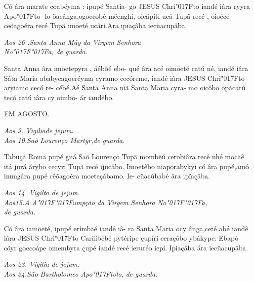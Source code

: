 \documentclass[openany,titlepage,12pt]{book}
\newcommand{\lgS}{\char"017F}
\newcommand{\lgSS}{\char"017F\char"017F}
\begin{document}
{\hspace*{-2ex}Có âra marate coabëyma : ipupé Santia-
go JESUS Chri\lgS to  iandé iâra ryyra Apo\lgS to-
lo öacânga,ogoecobé mëenghi, oieäpiti ucá
Tupã recé , oioécé cëõagoéra recé Tupã\linebreak
imöeté ucâri.Ara ipïaçâba iecüacupâba.}
\vspace*{2ex}
\begin{center}
    \textit{\footnotesize Aos 26 .Santa Anna Mãy da Virgem Senhora\\
    No\lgSS a, de guarda.}
\end{center}

{\hspace{-2ex}Santa Anna âra imöetepyra , äébõé ebo-
qué âra acé oimöeté catú né, iandé iâra Sãta
Maria ababycagoeréyma cyramo cecóreme,
iandé iâra JESUS Chri\lgS to  aryiamo cecó re-
cébé.Aé Santa Anna niã Santa Maria cyra-
mo oicôbo opácatú tecó catú iâra cy oimbö-
ár iandêbo.}

\begin{center}
    {EM AGOSTO.\\}
\end{center}
\begin{center}
    \textit{\footnotesize Aos 9. Vigiliade jejum.\\
    Aos 10.Saõ Lourenço Martyr,de guarda.}
\end{center}

{Tabuçá Roma pupé guá Saõ Lourenço
Tupã mombëú cerobiâra recé nhé mocäê
itá jurá árybo cecyri Tupã recé ijucâbo.
Imoetêbo niaporabykyi có âra pupé,amó
inungâra pupé cêõagoéra moeteçábamo. Ie-
cüacúbabé âra ipïaçâba.
}

\begin{center}
    \textit{\footnotesize Aos 14. Vigilta de jejum.\\
    Aos15.A A\lgSS umpção da Virgem Senhora No\lgSS a,\\
de guarda.}
\end{center}


{\hspace*{-2ex}Có âra iamöeté, ipupé erímbäé iandé iâ-\linebreak
ra Santa Maria ocy ânga,ceté abé iandê iâra
JESUS Chri\lgS to  Caräíbébé pytéripe çupíri
ceraçôbo ybákype. Ebapó cöyr goecoápe
omembyra çupé iandé recé ieruréo iepí.\linebreak
Ipiaçâba ára iecüacupâba.
}

\begin{center}
    \textit{\footnotesize Aos 23. Vigilia de jejum.\\
    Aos 24.São Bartholomeo Apo\lgS tolo, de guarda.}
\end{center}
\end{document}
